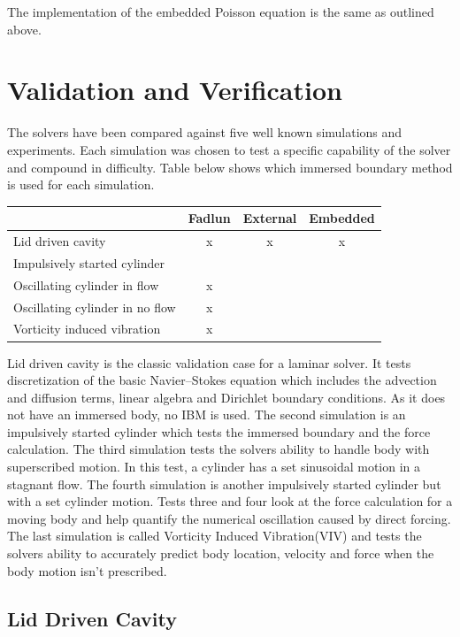 \documentclass[onehalf,11pt]{beavtex}
\begin{document}
The implementation of the embedded Poisson equation is the same as outlined above.


\chapter{Validation and Verification}\label{chapter:Validation}
The solvers have been compared against five well known simulations and experiments.
Each simulation was chosen to test a specific capability of the solver and compound in difficulty.
Table below shows which immersed boundary method is used for each simulation.

\begin{tabular}[htb]{ l | c | c | c |}\label{table:VV table}
	\centering
		& Fadlun & External & Embedded \\
	\hline
	Lid driven cavity & x & x & x \\
	\hline
	Impulsively started cylinder & \checkmark & \checkmark & \checkmark \\
	\hline
	Oscillating cylinder in flow & x & \checkmark & \checkmark \\
	\hline
	Oscillating cylinder in no flow & x & \checkmark & \checkmark \\
	\hline
	Vorticity induced vibration & x & \checkmark & \checkmark \\
	\hline
\end{tabular}

Lid driven cavity is the classic validation case for a laminar solver.
It tests discretization of the basic Navier--Stokes equation which includes the advection and diffusion terms, linear algebra and Dirichlet boundary conditions.
As it does not have an immersed body, no IBM is used.
The second simulation is an impulsively started cylinder which tests the immersed boundary and the force calculation.
The third simulation tests the solvers ability to handle body with superscribed motion.
In this test, a cylinder has a set sinusoidal motion in a stagnant flow.
The fourth simulation is another impulsively started cylinder but with a set cylinder motion.
Tests three and four look at the force calculation for a moving body and help quantify the numerical oscillation caused by direct forcing. 
The last simulation is called Vorticity Induced Vibration(VIV) and tests the solvers ability to accurately predict body location, velocity and force when the body motion isn't prescribed.

\section{Lid Driven Cavity}
\end{document}

